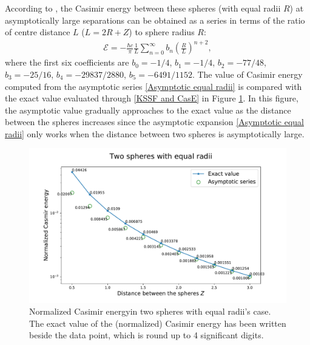 According to \cite{emig2008casimir}, the Casimir energy between these spheres (with equal radii $R$) at asymptotically 
large separations can be obtained as a series in terms of the ratio of centre distance $L$ ($L = 2R + Z$) to sphere radius $R$:
\begin{align}\label{Asymptotic equal radii}
   \mathcal{E} = -\frac{\hbar c}{\pi}\frac{1}{L}\sum_{n=0}^{\infty}b_{n}\left(\frac{R}{L}\right)^{n+2},
\end{align}
where the first six coefficients are 
$b_{0} = -1/4$, $b_{1} = -1/4$,  $b_{2} = -77/48$,  $b_{3} = -25/16$,  $b_{4} = -29837/2880$, $b_{5} = -6491/1152$. The value of Casimir energy computed from the 
asymptotic series \eqref{Asymptotic equal radii} is compared with the exact value evaluated through \eqref{KSSF and CasE} in Figure 
\ref{Casimir energy between spheres with equal radii}. In this figure, the asymptotic value gradually approaches to the exact value as the distance between the 
spheres increases since the asymptotic expansion \eqref{Asymptotic equal radii} only works when the distance between two spheres is asymptotically large.

\begin{figure}[H]
    \includegraphics[scale = 0.7]{figures/Spheres_equal_CasE.pdf}
    \caption[Caption for LOF]{Normalized Casimir energy\protect\footnotemark in two spheres with equal radii's case. The exact value of the (normalized) Casimir 
    energy has been written beside the data point, which is round up to 4 significant digits.}
    \label{Casimir energy between spheres with equal radii}
\end{figure}

